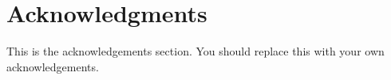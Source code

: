 \cleardoublepage


\readerpage

\cleardoublepage

\section*{Acknowledgments}

This is the acknowledgements section.  You should replace this with your
own acknowledgements.

\restoregeometry


